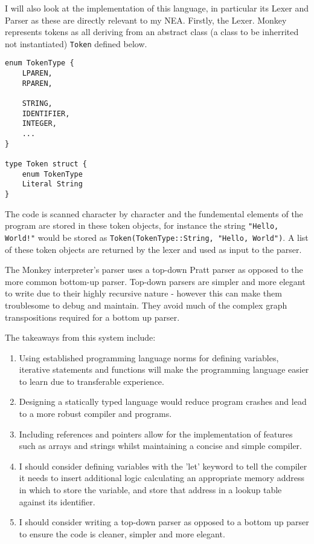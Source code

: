 I will also look at the implementation of this language, in particular its Lexer and Parser as these are directly relevant to my NEA. Firstly, the Lexer. Monkey represents tokens as all deriving from an abstract class (a class to be inherrited not instantiated) \texttt{Token} defined below.

\begin{lstlisting}
enum TokenType {
    LPAREN,
    RPAREN,

    STRING,
    IDENTIFIER,
    INTEGER,
    ...
}

type Token struct {
    enum TokenType
    Literal String
}
\end{lstlisting}

The code is scanned character by character and the fundemental elements of the program are stored in these token objects, for instance the string \texttt{"Hello, World!"} would be stored as \texttt{Token(TokenType::String, "Hello, World")}. A list of these token objects are returned by the lexer and used as input to the parser.

The Monkey interpreter's parser uses a top-down Pratt parser as opposed to the more common bottom-up parser.  Top-down parsers are simpler and more elegant to write due to their highly recursive nature - however this can make them troublesome to debug and maintain. They avoid much of the complex graph transpositions required for a bottom up parser.

The takeaways from this system include:
\begin{enumerate}
    \item Using established programming language norms for defining variables, iterative statements and functions will make the programming language easier to learn due to transferable experience.
    \item Designing a statically typed language would reduce program crashes and lead to a more robust compiler and programs.
    \item Including references and pointers allow for the implementation of features such as arrays and strings whilst maintaining a concise and simple compiler.
    \item I should consider defining variables with the 'let' keyword to tell the compiler it needs to insert additional logic calculating an appropriate memory address in which to store the variable, and store that address in a lookup table against its identifier.
    \item I should consider writing a top-down parser as opposed to a bottom up parser to ensure the code is cleaner, simpler and more elegant.
\end{enumerate}

